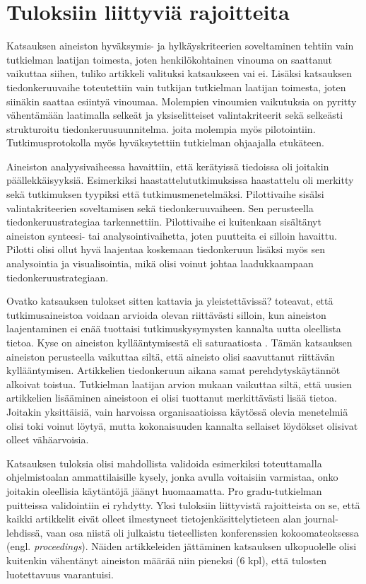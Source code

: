 \documentclass[utf8]{gradu3}
\begin{document}
\section{Tuloksiin liittyviä rajoitteita}
\label{luku-rajoitteet}

Katsauksen aineiston hyväksymis- ja hylkäyskriteerien soveltaminen tehtiin vain tutkielman laatijan toimesta, joten henkilökohtainen vinouma on saattanut vaikuttaa siihen, tuliko artikkeli valituksi katsaukseen vai ei. Lisäksi katsauksen tiedonkeruuvaihe toteutettiin vain tutkijan tutkielman laatijan toimesta, joten siinäkin saattaa esiintyä vinoumaa. Molempien vinoumien vaikutuksia on pyritty vähentämään laatimalla selkeät ja yksiselitteiset valintakriteerit sekä selkeästi strukturoitu tiedonkeruusuunnitelma. joita molempia myös pilotointiin. Tutkimusprotokolla myös hyväksytettiin tutkielman ohjaajalla etukäteen.

Aineiston analyysivaiheessa havaittiin, että kerätyissä tiedoissa oli joitakin päällekkäisyyksiä. Esimerkiksi haastattelututkimuksissa haastattelu oli merkitty sekä tutkimuksen tyypiksi että tutkimusmenetelmäksi. Pilottivaihe sisälsi valintakriteerien soveltamisen sekä tiedonkeruuvaiheen. Sen perusteella tiedonkeruustrategiaa tarkennettiin. Pilottivaihe ei kuitenkaan sisältänyt aineiston synteesi- tai analysointivaihetta, joten puutteita ei silloin havaittu. Pilotti olisi ollut hyvä laajentaa koskemaan tiedonkeruun lisäksi myös sen analysointia ja visualisointia, mikä olisi voinut johtaa laadukkaampaan tiedonkeruustrategiaan.

Ovatko katsauksen tulokset sitten kattavia ja yleistettävissä? \textcite{eskola-suoranta-1998} toteavat, että tutkimusaineistoa voidaan arvioida olevan riittävästi silloin, kun aineiston laajentaminen ei enää tuottaisi tutkimuskysymysten kannalta uutta oleellista tietoa. Kyse on aineiston kyllääntymisestä eli saturaatiosta \parencite{eskola-suoranta-1998}. Tämän katsauksen aineiston perusteella vaikuttaa siltä, että aineisto olisi saavuttanut riittävän kyllääntymisen. Artikkelien tiedonkeruun aikana samat perehdytyskäytännöt alkoivat toistua. Tutkielman laatijan arvion mukaan vaikuttaa siltä, että uusien artikkelien lisääminen aineistoon ei olisi tuottanut merkittävästi lisää tietoa. Joitakin yksittäisiä, vain harvoissa organisaatioissa käytössä olevia menetelmiä olisi toki voinut löytyä, mutta kokonaisuuden kannalta sellaiset löydökset olisivat olleet vähäarvoisia. 

Katsauksen tuloksia olisi mahdollista validoida esimerkiksi toteuttamalla ohjelmistoalan ammattilaisille kysely, jonka avulla voitaisiin varmistaa, onko joitakin oleellisia käytäntöjä jäänyt huomaamatta. Pro gradu-tutkielman puitteissa validointiin ei ryhdytty. Yksi tuloksiin liittyvistä rajoitteista on se, että kaikki artikkelit eivät olleet ilmestyneet tietojenkäsittelytieteen alan journal-lehdissä, vaan osa niistä oli julkaistu tieteellisten konferenssien kokoomateoksessa (engl. \textit{proceedings}). Näiden artikkeleiden jättäminen katsauksen ulkopuolelle olisi kuitenkin vähentänyt aineiston määrää niin pieneksi (6 kpl), että tulosten luotettavuus vaarantuisi.
\end{document}
